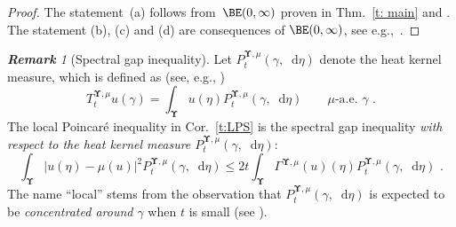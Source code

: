 \documentclass[11pt,letterpaper]{amsart}
\newcommand{\diff}{\mathop{}\!\mathrm{d}}
\newcommand{\fstop}{\,\,\mathrm{.}}
\newcommand{\cdc}{\Gamma}
\newcommand{\QP}{{\mu}}
\newcommand{\dUpsilon}{{\mathbf \Upsilon}}
\newcommand{\U}{\dUpsilon}
\newcommand{\E}{\mathcal E}
\renewcommand{\1}{\mathbf 1}
\numberwithin{equation}{section}
\theoremstyle{plain}
\theoremstyle{definition}
\theoremstyle{remark}
\newtheorem{rem}[thm]{\bf Remark}%
\begin{document}
\begin{proof}
The statement~(a) follows from~$\BE(0,\infty)$ proven in Thm.~\ref{t: main} and \cite[Cor.~2.3]{AmbGigSav15}. The statement (b), (c) and (d)  are consequences of $\BE(0,\infty)$, see e.g.,~\cite[Thm.s 4.7.2, 5.5.2, 5.5.5]{BakGenLed14}. 
\end{proof}

\begin{rem}[Spectral gap inequality]\label{r:LSG}
Let $P^{\U, \QP}_t(\gamma, \diff\eta)$ denote the heat kernel measure, which is defined as (see, e.g., \cite[(1.2.4) in p.12]{BakGenLed14})
$$T_t^{\U, \QP}u(\gamma)=\int_{\U} u(\eta) P^{\U, \QP}_t(\gamma, \diff\eta) \qquad \text{$\QP$-a.e.~$\gamma$} \fstop$$
The local Poincar\'e inequality in Cor.~\ref{t:LPS} is the spectral gap inequality {\it with respect to the heat kernel measure $P^{\U, \QP}_t(\gamma, \diff\eta)$}:
$$
\int_{\U} |u(\eta)-\QP(u)|^2P^{\U, \QP}_t(\gamma, \diff\eta) \le  2t\int_{\U} \cdc^{\U, \QP}(u)(\eta) P^{\U, \QP}_t(\gamma, \diff\eta)  \fstop 
$$
The name ``local'' stems from the observation that $P_t^{\U, \QP}(\gamma, \diff \eta)$ is expected to be {\it concentrated around $\gamma$} when $t$ is small (see \cite[\S 4.7 in p.~206]{BakGenLed14}). 
\end{rem}
\end{document}
